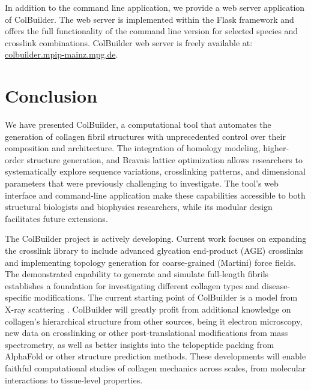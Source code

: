 \documentclass[10pt,letterpaper]{article}
\begin{document}
In addition to the command line application, we provide a web server application of ColBuilder. The web server is implemented within the Flask framework and offers the full functionality of the command line version for selected species and crosslink combinations. ColBuilder web server is freely available at: \href{https://colbuilder.mpip-mainz.mpg.de}{colbuilder.mpip-mainz.mpg.de}. 


\section*{Conclusion}

We have presented ColBuilder, a computational tool that automates the generation of collagen fibril structures with unprecedented control over their composition and architecture. The integration of homology modeling, higher-order structure generation, and Bravais lattice optimization allows researchers to systematically explore sequence variations, crosslinking patterns, and dimensional parameters that were previously challenging to investigate. The tool's web interface and command-line application make these capabilities accessible to both structural biologists and biophysics researchers, while its modular design facilitates future extensions.

The ColBuilder project is actively developing. Current work focuses on expanding the crosslink library to include advanced glycation end-product (AGE) crosslinks and implementing topology generation for coarse-grained (Martini) force fields. The demonstrated capability to generate and simulate full-length fibrils establishes a foundation for investigating different collagen types and disease-specific modifications. The current starting point of ColBuilder is a model from X-ray scattering \cite{orgel2006microfibrillar}. ColBuilder will greatly profit from additional knowledge on collagen's hierarchical structure from other sources, being it electron microscopy, new data on crosslinking or other post-translational modifications from mass spectrometry, as well as better insights into the telopeptide packing from AlphaFold \cite{jumper2021highly} or other structure prediction methods. These developments will enable faithful computational studies of collagen mechanics across scales, from molecular interactions to tissue-level properties.
\end{document}
